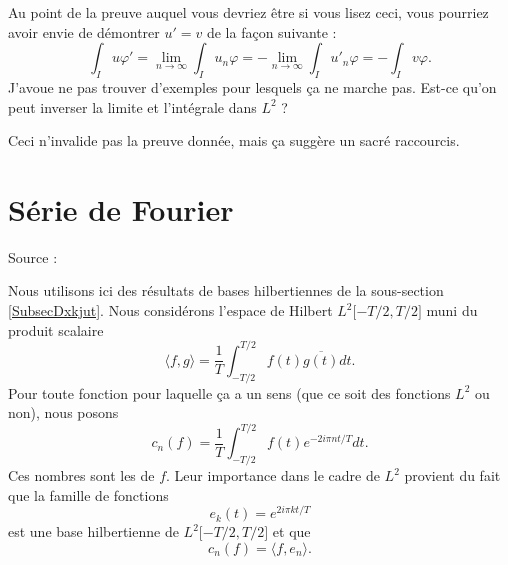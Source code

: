 \begin{probleme}    \label{ProbTOElufz}
    Au point de la preuve auquel vous devriez être si vous lisez ceci, vous pourriez avoir envie de démontrer \( u'=v\) de la façon suivante :
    \begin{equation}
        \int_I u\varphi'=\lim_{n\to \infty} \int_Iu_n\varphi=-\lim_{n\to \infty} \int_Iu'_n\varphi=-\int_Iv\varphi.
    \end{equation}
    J'avoue ne pas trouver d'exemples pour lesquels ça ne marche pas. Est-ce qu'on peut inverser la limite et l'intégrale dans \( L^2\) ?

    Ceci n'invalide pas la preuve donnée, mais ça suggère un sacré raccourcis.
\end{probleme}

\section{Série de Fourier}

Source : \cite{MaureyHilbertFourier}

Nous utilisons ici des résultats de bases hilbertiennes de la sous-section \ref{SubsecDxkjut}. Nous considérons l'espace de Hilbert \( L^2\mathopen[ -T/2 , T/2 \mathclose]\) muni du produit scalaire
\begin{equation}
    \langle f, g\rangle =\frac{1}{ T }\int_{-T/2}^{T/2}f(t)\overline{ g(t) }dt.
\end{equation}
Pour toute fonction pour laquelle ça a un sens (que ce soit des fonctions \( L^2\) ou non), nous posons
\begin{equation}\label{EqhIPoPH}
    c_n(f)=\frac{1}{ T }\int_{-T/2}^{T/2}f(t) e^{-2i\pi nt/T}dt.
\end{equation}
Ces nombres sont les  de \( f\). Leur importance dans le cadre de \( L^2\) provient du fait que la famille de fonctions
\begin{equation}
    e_k(t)=  e^{2i\pi kt/T}
\end{equation}
est une base hilbertienne de \( L^2\mathopen[ -T/2 , T/2 \mathclose]\) et que
\begin{equation}
    c_n(f)=\langle f, e_n\rangle .
\end{equation}


